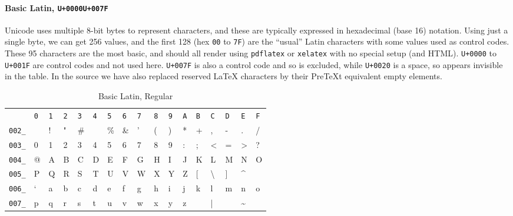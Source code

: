 \documentclass[10pt,]{article}
\theoremstyle{plain}
\theoremstyle{definition}
\theoremstyle{definition}
\theoremstyle{definition}
\theoremstyle{definition}
\theoremstyle{definition}
\theoremstyle{definition}
\numberwithin{equation}{section}
\begin{document}
\paragraph[{Basic Latin, \texttt{U+0000}\textendash{}\texttt{U+007F}}]{Basic Latin, \texttt{U+0000}\textendash{}\texttt{U+007F}}\hypertarget{paragraphs-7}{}
\hypertarget{p-602}{}%
Unicode uses multiple 8-bit bytes to represent characters, and these are typically expressed in hexadecimal (base 16) notation.  Using just a single byte, we can get 256 values, and the first 128 (hex \lstinline?00? to \lstinline?7F?) are the ``usual'' Latin characters with some values used as control codes.  These 95 characters are the most basic, and should all render using \lstinline?pdflatex? or \lstinline?xelatex? with no special setup (and HTML).  \lstinline?U+0000? to \lstinline?U+001F? are control codes and not used here.  \lstinline?U+007F? is also a control code and so is excluded, while \lstinline?U+0020? is a space, so appears invisible in the table.  In the source we have also replaced reserved \LaTeX{} characters by their PreTeXt equivalent empty elements.%
\begin{table}
\centering
\begin{tabular}{lllllllllllllllll}
&\lstinline?0?&\lstinline?1?&\lstinline?2?&\lstinline?3?&\lstinline?4?&\lstinline?5?&\lstinline?6?&\lstinline?7?&\lstinline?8?&\lstinline?9?&\lstinline?A?&\lstinline?B?&\lstinline?C?&\lstinline?D?&\lstinline?E?&\lstinline?F?\tabularnewline[0pt]
\lstinline?002_?&&!&"&\#&\textdollar{}&\%&\&&'&(&)&*&+&,&-&.&/\tabularnewline[0pt]
\lstinline?003_?&0&1&2&3&4&5&6&7&8&9&:&;&\textless{}&=&>&?\tabularnewline[0pt]
\lstinline?004_?&@&A&B&C&D&E&F&G&H&I&J&K&L&M&N&O\tabularnewline[0pt]
\lstinline?005_?&P&Q&R&S&T&U&V&W&X&Y&Z&[&\textbackslash{}&]&\textasciicircum{}&\textunderscore{}\tabularnewline[0pt]
\lstinline?006_?&`&a&b&c&d&e&f&g&h&i&j&k&l&m&n&o\tabularnewline[0pt]
\lstinline?007_?&p&q&r&s&t&u&v&w&x&y&z&\textbraceleft{}&|&\textbraceright{}&\textasciitilde{}&
\end{tabular}
\caption{Basic Latin, Regular\label{table-17}}
\end{table}
\typeout{************************************************}
\typeout{************************************************}
\end{document}
